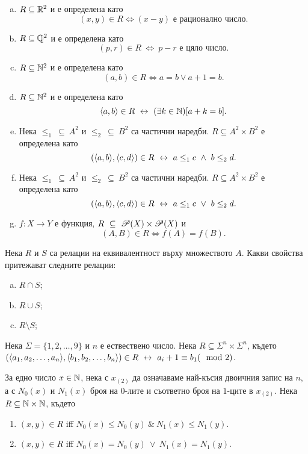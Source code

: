 \begin{problem}
\begin{enumerate}[a)]
  \item
    $R\subseteq \mathbb{R}^2$ и е определена като 
    \[(x,y) \in R \iff (x-y)\mbox{ е рационално число}.\]
  \item
    $R \subseteq \mathbb{Q}^2$ и е определена като
    \[(p,r) \in R\ \iff\ p-r \mbox{ е цяло число}.\]
  \item
    $R \subseteq \mathbb{N}^2$ и е определена като
    \[(a,b) \in R \iff a = b \vee a+1 = b.\]
  \item
    $R \subseteq \mathbb{N}^2$ и е определена като
    \[\langle{a,b}\rangle\in R \ \leftrightarrow\  (\exists k\in\mathbb{N})[a+k = b].\]
  \item
    Нека $\leq_1\ \subseteq\ A^2$ и $\leq_2\ \subseteq\ B^2$ са частични наредби.
    $R \subseteq A^2\times B^2$ е определена като
    \[(\langle{a,b}\rangle, \langle{c,d}\rangle) \in R \ \leftrightarrow\  a\leq_{1}c\ \wedge\ b\leq_{2}d .\]
  \item
    Нека $\leq_1\ \subseteq\ A^2$ и $\leq_2\ \subseteq\ B^2$ са частични наредби.
    $R \subseteq A^2\times B^2$ е определена като
    \[(\langle{a,b}\rangle, \langle{c,d}\rangle) \in R \ \leftrightarrow\  a\leq_{1}c\ \vee\ b\leq_{2}d .\]
  \item
    $f:X\rightarrow Y$ е функция, $R\ \subseteq\ \Ps(X)\times\Ps(X)$ и 
    \[(A,B)\in R \iff f(A) = f(B).\]
  \end{enumerate}
\end{problem}

\begin{problem}
  Нека $R$ и $S$ са релации на еквивалентност върху множеството $A$.
  Какви свойства притежават следните релации:
  \begin{enumerate}[a)]
  \item
    $R \cap S$;
  \item
    $R \cup S$;
  \item
    $R \setminus S$;
  \end{enumerate}
\end{problem}

\begin{problem}
  Нека $\Sigma = \{1,2,\dots,9\}$ и $n$ е ествествено число.
  Нека $R \subseteq \Sigma^n \times \Sigma^n$, където
  $(\langle{a_1,a_2,\dots,a_n}\rangle,\langle{b_1,b_2,\dots,b_n}\rangle) \in R \ \leftrightarrow\  a_i + 1 \equiv b_1 (\mod 2)$.
\end{problem}

\begin{problem}
  За едно число $x \in \mathbb{N}$, нека с $x_{(2)}$ да означаваме най-късия двоичния запис на $n$,
  а с $N_0(x)$ и $N_1(x)$ броя на $0$-лите и съответно броя на $1$-ците в $x_{(2)}$.
  Нека $R \subseteq \mathbb{N}\times\mathbb{N}$, където
  \begin{enumerate}
  \item 
    $(x,y) \in R$ iff $N_0(x) \leq N_0(y)\ \&\ N_1(x) \leq N_1(y)$.
  \item
    $(x,y) \in R$ iff $N_0(x) = N_0(y)\ \vee\ N_1(x) = N_1(y)$.
  \end{enumerate}
\end{problem}



